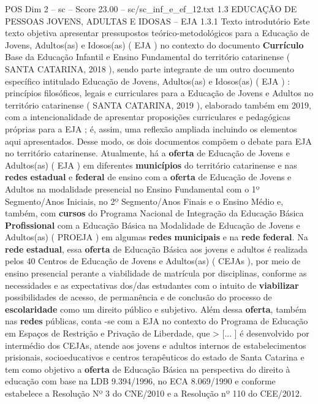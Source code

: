 \begin{textsample}{POS Dim 2 – sc – Score 23.00 – sc/sc\_inf\_e\_ef\_12.txt}  \label{ex:f2_pos_009}
1.3 EDUCAÇÃO DE PESSOAS JOVENS, ADULTAS E IDOSAS – EJA 1.3.1 Texto introdutório Este texto objetiva apresentar pressupostos teórico-metodológicos para a Educação de Jovens, Adultos(as) e Idosos(as) ( EJA ) no contexto do documento \textbf{Currículo} Base da Educação Infantil e Ensino Fundamental do território catarinense ( SANTA CATARINA, 2018 ), sendo parte integrante de um outro documento específico intitulado Educação de Jovens, Adultos(as) e Idosos(as) ( EJA ) : princípios filosóficos, legais e curriculares para a Educação de Jovens e Adultos no território catarinense ( SANTA CATARINA, 2019 ), elaborado também em 2019, com a intencionalidade de apresentar proposições curriculares e pedagógicas próprias para a EJA ; é, assim, uma reflexão ampliada incluindo os elementos aqui apresentados.
Desse modo, os dois documentos compõem o debate para EJA no território catarinense.
Atualmente, há a \textbf{oferta} de Educação de Jovens e Adultos(as) ( EJA ) em diferentes \textbf{municípios} do território catarinense e nas \textbf{redes} \textbf{estadual} e \textbf{federal} de ensino com a \textbf{oferta} de Educação de Jovens e Adultos na modalidade presencial no Ensino Fundamental com o 1º Segmento/Anos Iniciais, no 2º Segmento/Anos Finais e o Ensino Médio e, também, com \textbf{cursos} do Programa Nacional de Integração da Educação Básica \textbf{Profissional} com a Educação Básica na Modalidade de Educação de Jovens e Adultos(as) ( PROEJA ) em algumas \textbf{redes} \textbf{municipais} e na \textbf{rede} \textbf{federal}.
Na \textbf{rede} \textbf{estadual}, essa \textbf{oferta} de Educação Básica aos jovens e adultos é realizada pelos 40 Centros de Educação de Jovens e Adultos(as) ( CEJAs ), por meio de ensino presencial perante a viabilidade de matrícula por disciplinas, conforme as necessidades e as expectativas dos/das estudantes com o intuito de \textbf{viabilizar} possibilidades de acesso, de permanência e de conclusão do processo de \textbf{escolaridade} como um direito público e subjetivo.
Além dessa \textbf{oferta}, também nas \textbf{redes} públicas, conta -se com a EJA no contexto do Programa de Educação em Espaços de Restrição e Privação de Liberdade, que > [... ] é desenvolvido por intermédio dos CEJAs, atende aos jovens e adultos internos de estabelecimentos prisionais, socioeducativos e centros terapêuticos do estado de Santa Catarina e tem como objetivo a \textbf{oferta} de Educação Básica na perspectiva do direito à educação com base na LDB 9.394/1996, no ECA 8.069/1990 e conforme estabelece a Resolução Nº 3 do CNE/2010 e a Resolução nº 110 do CEE/2012.

\end{textsample}
